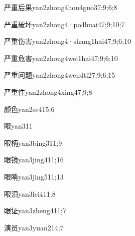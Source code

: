 \begin{verbete}{严重后果}{yan2zhong4hou4guo3}{7;9;6;8}
\end{verbete}
\begin{verbete}{严重破坏}{yan2zhong4·po4huai4}{7;9;10;7}
\end{verbete}
\begin{verbete}{严重伤害}{yan2zhong4·shang1hai4}{7;9;6;10}
\end{verbete}
\begin{verbete}{严重危害}{yan2zhong4wei1hai4}{7;9;6;10}
\end{verbete}
\begin{verbete}{严重问题}{yan2zhong4wen4ti2}{7;9;6;15}
\end{verbete}
\begin{verbete}{严重性}{yan2zhong4xing4}{7;9;8}
\end{verbete}
\begin{verbete}{颜色}{yan2se4}{15;6}
\end{verbete}
\begin{verbete}{眼}{yan3}{11}
\end{verbete}
\begin{verbete}{眼柄}{yan3bing3}{11;9}
\end{verbete}
\begin{verbete}{眼镜}{yan3jing4}{11;16}
\end{verbete}
\begin{verbete}{眼睛}{yan3jing5}{11;13}
\end{verbete}
\begin{verbete}{眼泪}{yan3lei4}{11;8}
\end{verbete}
\begin{verbete}{眼证}{yan3zheng4}{11;7}
\end{verbete}
\begin{verbete}{演员}{yan3yuan2}{14;7}
\end{verbete}
